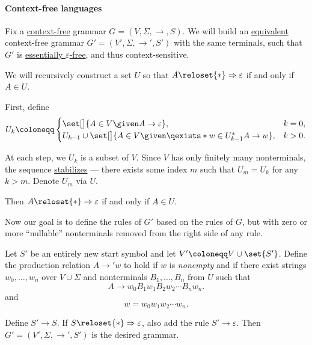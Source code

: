 \paragraph{Context-free languages}

\begin{algorithm}\label{alg:epsilon_rule_removal}
  Fix a \hyperref[def:chomsky_hierarchy/context_free]{context-free} grammar \( G = (V, \Sigma, \to, S) \). We will build an \hyperref[def:formal_grammar/equivalent]{equivalent} context-free grammar \( G' = (V', \Sigma, \to', S') \) with the same terminals, such that \( G' \) is \hyperref[def:epsilon_free_grammar]{essentially \( \varepsilon \)-free}, and thus context-sensitive.

  \begin{thmenum}
     We will recursively construct a set \( U \) so that \( A \reloset {*} \Rightarrow \varepsilon \) if and only if \( A \in U \).

    First, define
    \begin{equation*}
      U_k \coloneqq \begin{cases}
        \set[\big]{ A \in V \given A \to \varepsilon },                               &k = 0, \\
        U_{k-1} \cup \set[\big]{ A \in V \given \qexists*{w \in U_{k-1}^*} A \to w }, &k > 0.
      \end{cases}
    \end{equation*}

    At each step, we \( U_k \) is a subset of \( V \). Since \( V \) has only finitely many nonterminals, the sequence \hyperref[def:stabilizing_sequence]{stabilizes} --- there exists some index \( m \) such that \( U_m = U_k \) for any \( k > m \). Denote \( U_m \) via \( U \).

    Then \( A \reloset {*} \Rightarrow \varepsilon \) if and only if \( A \in U \).

     Now our goal is to define the rules of \( G' \) based on the rules of \( G \), but with zero or more \enquote{nullable} nonterminals removed from the right side of any rule.

    Let \( S' \) be an entirely new start symbol and let \( V' \coloneqq V \cup \set{ S' } \). Define the production relation \( A \to' w \) to hold if \( w \) is \emph{nonempty} and if there exist strings \( w_0, \ldots, w_n \) over \( V \cup \Sigma \) and nonterminals \( B_1, \ldots, B_n \) from \( U \) such that
    \begin{equation*}
      A \to w_0 B_1 w_1 B_2 w_2 \cdots B_n w_n.
    \end{equation*}
    and
    \begin{equation*}
      w = w_0 w_1 w_2 \cdots w_n.
    \end{equation*}

     Define \( S' \to S \). If \( S \reloset {*} \Rightarrow \varepsilon \), also add the rule \( S' \to \varepsilon \). Then \( G' = (V', \Sigma, \to', S') \) is the desired grammar.
  \end{thmenum}
\end{algorithm}
